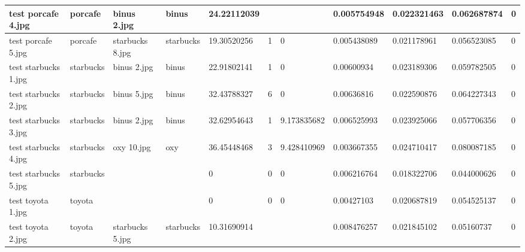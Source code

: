 \begin{landscape}
\begin{longtable}{|p{2cm}|p{1.5cm}|p{2cm}|p{1.5cm}|p{2cm}|p{1cm}|p{2cm}|p{2cm}|p{2cm}|p{2cm}|p{1cm}|}
		test porcafe 4.jpg   & porcafe          & binus 2.jpg           & binus                       & 24.22112039           &                         &                            & 0.005754948           & 0.022321463           & 0.062687874              & 0                \\ \hline
		test porcafe 5.jpg   & porcafe          & starbucks 8.jpg       & starbucks                   & 19.30520256           & 1                       & 0                          & 0.005438089           & 0.021178961           & 0.056523085              & 0                \\ \hline
		test starbucks 1.jpg & starbucks        & binus 2.jpg           & binus                       & 22.91802141           & 1                       & 0                          & 0.00600934            & 0.023189306           & 0.059782505              & 0                \\ \hline
		test starbucks 2.jpg & starbucks        & binus 5.jpg           & binus                       & 32.43788327           & 6                       & 0                          & 0.00636816            & 0.022590876           & 0.064227343              & 0                \\ \hline
		test starbucks 3.jpg & starbucks        & binus 2.jpg           & binus                       & 32.62954643           & 1                       & 9.173835682                & 0.006525993           & 0.023925066           & 0.057706356              & 0                \\ \hline
		test starbucks 4.jpg & starbucks        & oxy 10.jpg            & oxy                         & 36.45448468           & 3                       & 9.428410969                & 0.003667355           & 0.024710417           & 0.080087185              & 0                \\ \hline
		test starbucks 5.jpg & starbucks        &                       &                             & 0                     & 0                       & 0                          & 0.006216764           & 0.018322706           & 0.044000626              & 0                \\ \hline
		test toyota 1.jpg    & toyota           &                       &                             & 0                     & 0                       & 0                          & 0.00427103            & 0.020687819           & 0.054525137              & 0                \\ \hline
		test toyota 2.jpg    & toyota           & starbucks 5.jpg       & starbucks                   & 10.31690914           &                         &                            & 0.008476257           & 0.021845102           & 0.05160737               & 0                \\ \hline

\end{longtable}
\end{landscape}
